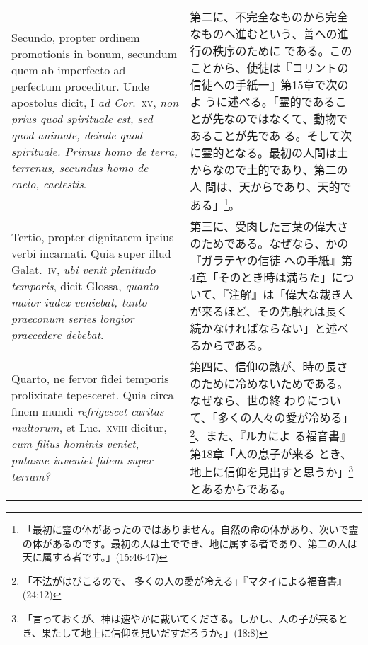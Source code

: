 \documentclass[10pt]{jsarticle} %
\begin{document}
\begin{longtable}{p{21em}p{21em}}
\\


Secundo, propter
ordinem promotionis in bonum, secundum quem ab imperfecto ad perfectum
proceditur. Unde apostolus dicit, I {\itshape ad Cor}.~{\scshape xv}, {\itshape non prius quod
spirituale est, sed quod animale, deinde quod spirituale. Primus homo de
terra, terrenus, secundus homo de caelo, caelestis}. 



&

第二に、不完全なものから完全なものへ進むという、善への進行の秩序のために
 である。このことから、使徒は『コリントの信徒への手紙一』第15章で次のよ
 うに述べる。「霊的であることが先なのではなくて、動物であることが先であ
 る。そして次に霊的となる。最初の人間は土からなので土的であり、第二の人
 間は、天からであり、天的である」\footnote{「最初に霊の体があったのではありません。自然の命の体があり、次いで霊の体があるのです。最初の人は土ででき、地に属する者であり、第二の人は天に属する者です。」(15:46-47)}。


\\


Tertio, propter
dignitatem ipsius verbi incarnati. Quia super illud Galat.~{\scshape iv}, {\itshape ubi venit
plenitudo temporis}, dicit Glossa, {\itshape quanto maior iudex veniebat, tanto
praeconum series longior praecedere debebat}. 



&

第三に、受肉した言葉の偉大さのためである。なぜなら、かの『ガラテヤの信徒
 への手紙』第4章「そのとき時は満ちた」について、『注解』は「偉大な裁き人
 が来るほど、その先触れは長く続かなければならない」と述べるからである。


\\


Quarto, ne fervor fidei
temporis prolixitate tepesceret. Quia circa finem mundi {\itshape refrigescet
caritas multorum}, et Luc.~{\scshape xviii} dicitur, {\itshape cum filius hominis veniet,
putasne inveniet fidem super terram?}


&

第四に、信仰の熱が、時の長さのために冷めないためである。なぜなら、世の終
 わりについて、「多くの人々の愛が冷める」\footnote{「不法がはびこるので、
 多くの人の愛が冷える」『マタイによる福音書』(24:12)}、また、『ルカによ
 る福音書』第18章「人の息子が来る
 とき、地上に信仰を見出すと思うか」\footnote{「言っておくが、神は速やかに裁いてくださる。しかし、人の子が来るとき、果たして地上に信仰を見いだすだろうか。」(18:8)}とあるからである。




\end{longtable}
\end{document}

